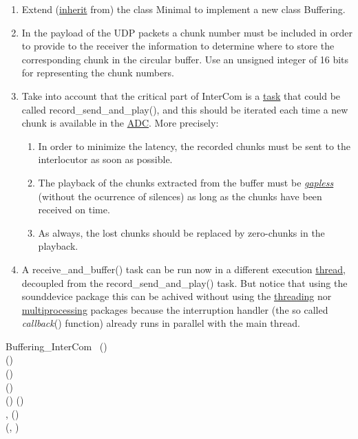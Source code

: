 \begin{enumerate}
\item Extend
  (\href{https://en.wikipedia.org/wiki/Inheritance_(object-oriented_programming)}{inherit}
  from) the class Minimal to implement a new class
  Buffering.
\item In the payload of the UDP packets a chunk number must be
  included in order to provide to the receiver the information to
  determine where to store the corresponding chunk in the circular
  buffer. Use an unsigned integer of 16 bits for representing the
  chunk numbers.
\item Take into account that the critical part of InterCom is a
  \href{https://en.wikipedia.org/wiki/Task_(computing)}{task} that
  could be called record\_send\_and\_play(), and this should be
  iterated each time a new chunk is available in the
  \href{https://en.wikipedia.org/wiki/Analog-to-digital_converter}{ADC}. More
  precisely:
  \begin{enumerate}
  \item In order to minimize the latency, the recorded chunks must be
    sent to the interlocutor as soon as possible.
  \item The playback of the chunks extracted from the buffer must be
    \href{https://en.wikipedia.org/wiki/Gapless_playback}{\emph{gapless}}
    (without the ocurrence of silences) as long as the chunks have
    been received on time.
  \item As always, the lost chunks should be replaced by zero-chunks
    in the playback.
  \end{enumerate}
\item A receive\_and\_buffer() task can be run now in a different
  execution
  \href{https://en.wikipedia.org/wiki/Thread_(computing)}{thread},
  decoupled from the record\_send\_and\_play() task. But notice that
  using the sounddevice package this can be achived without using the
  \href{https://docs.python.org/3/library/threading.html}{threading}
  nor
  \href{https://docs.python.org/3/library/multiprocessing.html}{multiprocessing}
   packages because the interruption handler (the so called
  \emph{callback}() function) already runs in parallel with the main
  thread.
\end{enumerate}

\begin{pseudocode}{Buffering\_InterCom}{~}
  \BEGIN
     \GETS {}()\\
     \GETS {}()\\
    ()\\
     \GETS {}()\\
    ()
  \END
  \ENDPROCEDURE
  \BEGIN
     \GETS {}()\\
    ,  \GETS {}()\\
    (, )
  \END
  \ENDPROCEDURE
\end{pseudocode}

